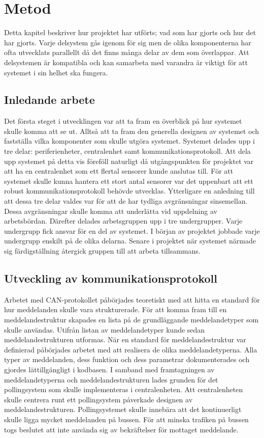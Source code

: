 \documentclass[a4paper]{article}
\newcommand{\todo}[1]{\marginpar{TODO: #1}\vspace{1cm}}
\begin{document}
\newpage

\todo{Varför vi har gjort som vi har gjort}
\section{Metod}
Detta kapitel beskriver hur projektet har utförts; vad som har gjorts och hur det har gjorts.
Varje delsystem gås igenom för sig men de olika komponenterna har ofta utvecklats parallellt då det finns många delar av dem som överlappar.
Att delsystemen är kompatibla och kan samarbeta med varandra är viktigt för att systemet i sin helhet ska fungera.

\subsection{Inledande arbete}

Det första steget i utvecklingen var att ta fram en överblick på hur systemet skulle komma att se ut.
Alltså att ta fram den generella designen av systemet och fastställa vilka komponenter som skulle utgöra systemet.
Systemet delades upp i tre delar:
periferienheter, centralenhet samt kommunikationsprotokoll.
Att dela upp systemet på detta vis föreföll naturligt då utgångspunkten för projektet var att ha en centralenhet som ett flertal sensorer kunde anslutas till.
För att systemet skulle kunna hantera ett stort antal sensorer var det uppenbart att ett robust kommunikationsprotokoll behövde utvecklas.
Ytterligare en anledning till att dessa tre delar valdes var för att de har tydliga avgränsningar sinsemellan.
Dessa avgränsningar skulle komma att underlätta vid uppdelning av arbetsbördan.
Därefter delades arbetsgruppen upp i tre undergrupper.
Varje undergrupp fick ansvar för en del av systemet.
I början av projektet jobbade varje undergrupp enskilt på de olika delarna.
Senare i projektet när systemet närmade sig färdigställning återgick gruppen till att arbeta tillsammans.

\subsection{Utveckling av kommunikationsprotokoll}
Arbetet med CAN-protokollet påbörjades teoretiskt med att hitta en standard för hur meddelanden skulle vara strukturerade.
För att komma fram till en meddelandestruktur skapades en lista på de grundläggande meddelandetyper som skulle användas.
Utifrån listan av meddelandetyper kunde sedan meddelandestrukturen utformas.
När en standard för meddelandestruktur var definierad påbörjades arbetet med att realisera de olika meddelandetyperna.
Alla typer av meddelanden, dess funktion och dess parametrar dokumenterades och gjordes lättillgängligt i kodbasen.
I samband med framtagningen av meddelandetyperna och meddelandestrukturen lades grunden för det pollingsystem som skulle implementeras i centralenheten.
Att centralenheten skulle centrera runt ett pollingsystem påverkade designen av meddelandestrukturen.
Pollingsystemet skulle innebära att det kontinuerligt skulle ligga mycket meddelanden på bussen.
För att minska trafiken på bussen togs beslutet att inte använda sig av bekräftelser för mottaget meddelande.
\end{document}
